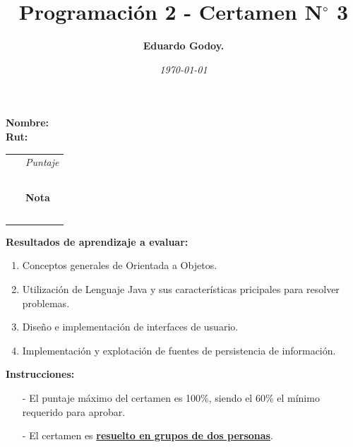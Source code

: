 \documentclass{exam}
\title{\huge\bfseries{\color{azul}Programaci\'on 2 - Certamen N$^{\circ}$ 3 }}
\author{\textbf{Eduardo Godoy.}}
\date{\em \today}
\begin{document}


\maketitle

\begin{multicols}{2}
    \begin{flushleft}
        \textbf{Nombre:} \\
        \vspace*{2mm}
        \textbf{Rut:}
    \end{flushleft}
    \begin{center}
        \begin{table}[H]
        \begin{tabular}{p{4cm}|p{3cm}|}
        \cline{2-2}
            ~ & {\em {\scriptsize Puntaje}} \\ & ~ \\
            ~ & \textbf{Nota} \\ & ~ \\
        \cline{2-2}
        \end{tabular}
        \end{table}
    \end{center}
\end{multicols}


\vspace*{-7mm}
\noindent
\textbf{Resultados de aprendizaje a evaluar:}
\begin{enumerate}
  \item Conceptos generales de Orientada a Objetos.
  \item Utilizaci\'on de Lenguaje Java y sus caracter\'isticas pricipales para resolver problemas.
  \item Diseño e implementaci\'on de interfaces de usuario.
  \item Implementaci\'on y explotaci\'on de fuentes de persistencia de informaci\'on.
\end{enumerate}
\vspace{5mm}
\noindent
\textbf{Instrucciones:}
\begin{itemize}
  \item[-] El puntaje m\'aximo del certamen es 100\%, siendo el 60\% el m\'inimo requerido para aprobar.
  \item[-] El certamen es \underline{\textbf{resuelto en grupos de dos personas}}.
\end{itemize}
\end{document}
